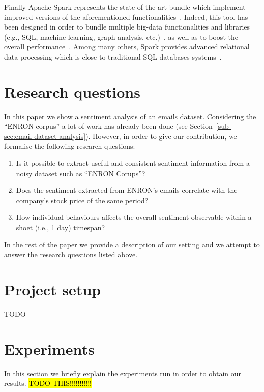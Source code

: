 \documentclass{vldb}
\newcommand{\hlc}[2][lightcyan]{{\sethlcolor{#1}\hl{#2}}}
\begin{document}
Finally Apache Spark represents the state-of-the-art bundle which implement improved versions of the aforementioned functionalities~\cite{shoro2015big}.
Indeed, this tool has been designed in order to bundle multiple big-data functionalities and libraries (e.g., SQL, machine learning, graph analysis, etc.)~\cite{meng2015mllib}, as well as to boost the overall performance~\cite{gopalani2015comparing}.
Among many others, Spark provides advanced relational data processing which is close to traditional SQL databases systems~\cite{armbrust2015spark}. 


\section{Research questions}
\label{sec:r-q}
In this paper we show a sentiment analysis of an emails dataset.
Considering the ``ENRON corpus'' a lot of work has already been done (see Section~\ref{sub-sec:email-dataset-analysis}).
However, in order to give our contribution, we formalise the following research questions:
\begin{enumerate}
	\item Is it possible to extract useful and consistent sentiment information from a noisy dataset such as ``ENRON Corups''?
	\item Does the sentiment extracted from ENRON's emails correlate with the company's stock price of the same period?
	\item How individual behaviours affects the overall sentiment observable within a shoet (i.e., 1 day) timespan?
\end{enumerate}

In the rest of the paper we provide a description of our setting and we attempt to answer the research questions listed above.


\section{Project setup}
\label{sec:p-s}
TODO

\section{Experiments}
\label{sec:exp}
In this section we briefly explain the experiments run in order to obtain our results.
\hlc{TODO THIS!!!!!!!!!!!}
\end{document}
